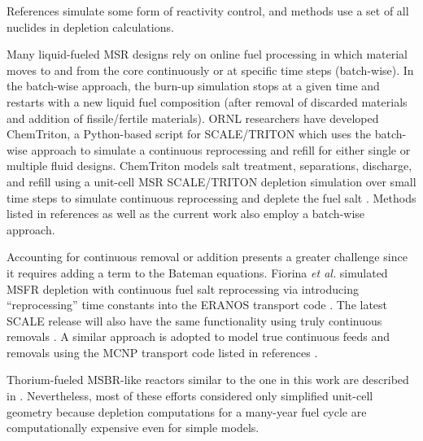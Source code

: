 References 
\cite{doligez_coupled_2014,heuer_towards_2014,sheu_depletion_2013,aufiero_extended_2013} 
simulate some form of reactivity control, and methods 
\cite{doligez_coupled_2014,heuer_towards_2014,aufiero_extended_2013,ahmad_neutronics_2015, 
park_whole_2015, 
jeong_equilibrium_2016,rykhlevskii_online_2017,nuttin_potential_2005} use a set 
of all nuclides in depletion calculations. 

Many liquid-fueled \gls{MSR} designs rely on online fuel processing in which  
material moves to and from the core continuously or at specific time steps 
(batch-wise). In the batch-wise approach, the burn-up simulation stops at a given 
time and restarts with a new liquid fuel composition (after removal of discarded 
materials and addition of fissile/fertile materials). \gls{ORNL} researchers 
have developed ChemTriton, a Python-based script for SCALE/TRITON which uses the 
batch-wise approach to simulate a continuous reprocessing and refill for either single 
or multiple fluid designs. ChemTriton models salt 
treatment, separations, discharge, and refill using a unit-cell \gls{MSR} 
SCALE/TRITON depletion simulation over small time steps to simulate continuous 
reprocessing and deplete the fuel salt \cite{powers_new_2013}. Methods listed in 
references \cite{zhou_fuel_2018,sheu_depletion_2013,park_whole_2015, 
jeong_equilibrium_2016,powers_inventory_2014,betzler_molten_2017,rykhlevskii_online_2017} 
as well as the current work also employ a batch-wise approach.

Accounting for continuous removal or addition presents a greater challenge since it 
requires adding a term to the Bateman equations. Fiorina \emph{et al.} simulated 
\gls{MSFR} depletion with continuous fuel salt reprocessing via introducing 
``reprocessing'' time constants into the ERANOS transport code 
\cite{fiorina_investigation_2013}. 
The latest SCALE release will also have the same functionality using truly 
continuous removals \cite{betzler_implementation_2017}. 
A similar approach is adopted to model true continuous feeds and removals using the MCNP transport code listed in references \cite{doligez_coupled_2014,heuer_towards_2014,nuttin_potential_2005}.

Thorium-fueled \gls{MSBR}-like reactors similar to the one in this work are 
described in \cite{park_whole_2015, 
jeong_equilibrium_2016,powers_new_2013,powers_inventory_2014, 
betzler_molten_2017,rykhlevskii_online_2017,nuttin_potential_2005}. 
Nevertheless, most of these efforts considered only simplified unit-cell 
geometry because depletion computations for a many-year fuel cycle are 
computationally expensive even for simple models. 

